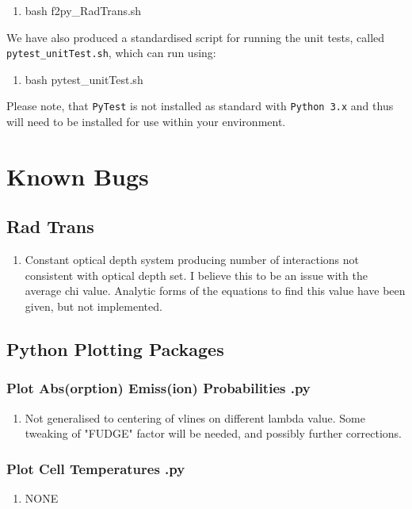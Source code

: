\begin{enumerate}
    \item bash f2py\_RadTrans.sh
\end{enumerate}

We have also produced a standardised script for running the unit tests, called \verb|pytest_unitTest.sh|, which can run using:

\begin{enumerate}
    \item bash pytest\_unitTest.sh
\end{enumerate}

Please note, that \verb|PyTest| is not installed as standard with \verb|Python 3.x| and thus will need to be installed for use within your environment.

\section{Known Bugs}

\subsection{Rad Trans}
\begin{enumerate}
    \item  Constant optical depth system producing number of interactions not
           consistent with optical depth set.
           I believe this to be an issue with the average chi value. Analytic
           forms of the equations to find this value have been given, but
           not implemented.
\end{enumerate}

\subsection{Python Plotting Packages}
\subsubsection{Plot Abs(orption) Emiss(ion) Probabilities .py}
\begin{enumerate}
    \item  Not generalised to centering of vlines on different lambda value.
            Some tweaking of "FUDGE" factor will be needed, and possibly further
            corrections.
\end{enumerate}

\subsubsection{Plot Cell Temperatures .py}
\begin{enumerate}
    \item  NONE
\end{enumerate}

